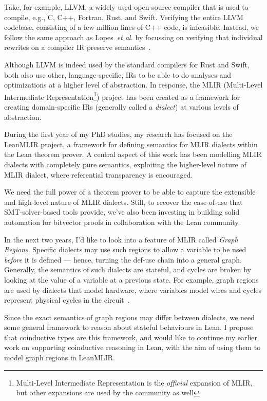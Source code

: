 \documentclass[a4paper]{scrartcl}
\newcommand*{\etal}{~\emph{et al.}}
\begin{document}
Take, for example, LLVM, a widely-used open-source compiler that is used
to compile, e.g., C, C++, Fortran, Rust, and Swift. Verifying the entire
LLVM codebase, consisting of a few million lines of C++ code, is
infeasible. Instead, we follow the same approach as Lopes\etal{} by
focussing on verifying that individual rewrites on a compiler IR preserve
semantics~\cite{lopesAlive2BoundedTranslation2021}.

Although LLVM is indeed used by the standard compilers for Rust and
Swift, both also use other, language-specific, IRs to be able to do
analyses and optimizations at a higher level of abstraction. In
response, the MLIR (Multi-Level Intermediate Representation\footnote{Multi-Level
  Intermediate Representation is the \emph{official} expansion of MLIR,
  but other expansions are used by the community as well}) project has
been created as a framework for creating domain-specific IRs (generally
called a \emph{dialect}) at various levels of abstraction.

During the first year of my PhD studies, my research has focused on the
LeanMLIR project, a framework for defining semantics for MLIR dialects
within the Lean theorem prover. A central aspect of this work has been
modelling MLIR dialects with completely pure semantics, exploiting the
higher-level nature of MLIR dialect, where referential transparency is
encouraged.

We need the full power of a theorem prover to be able to capture the
extensible and high-level nature of MLIR dialects.
Still, to recover the ease-of-use that SMT-solver-based tools provide, 
we've also been investing in building solid automation for bitvector proofs in collaboration with the Lean community.

In the next two years, I'd like to look into a feature of MLIR called
\emph{Graph Regions}. Specific dialects may use such regions to allow a
variable to be used \emph{before} it is defined --- hence, turning the
def-use chain into a general graph. Generally, the semantics of such
dialects are stateful, and cycles are broken by looking at the value of
a variable at a previous state.
For example, graph regions are used by
dialects that model hardware,
where variables model wires and cycles represent physical cycles in the
circuit~\cite{eldridgeMLIRHardwareCompiler}.

Since the exact semantics of graph regions may differ between dialects,
we need some general framework to reason about stateful behaviours in
Lean. I propose that coinductive types are this framework, and would
like to continue my earlier work on supporting coinductive reasoning in
Lean, with the aim of using them to model graph regions in LeanMLIR.
\end{document}
